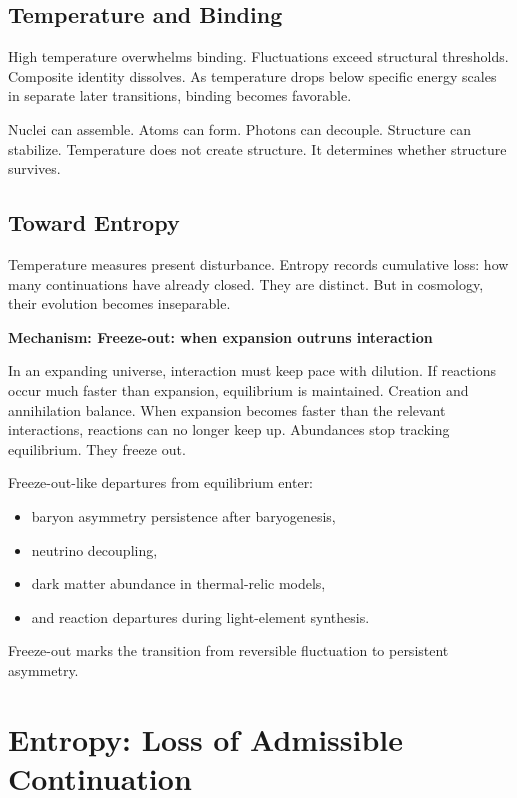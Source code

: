 \documentclass[11pt,twoside,openright]{book}
\newenvironment{mechanismbox}[1]
  {\begin{framed}\noindent\textbf{Mechanism: #1}\par\medskip}
  {\end{framed}}
\begin{document}
\section*{Temperature and Binding}

High temperature overwhelms binding. Fluctuations exceed structural thresholds. Composite identity dissolves. As temperature drops below specific energy scales in separate later transitions, binding becomes favorable.

Nuclei can assemble. Atoms can form. Photons can decouple. Structure can stabilize. Temperature does not create structure. It determines whether structure survives.

\section*{Toward Entropy}

Temperature measures present disturbance. Entropy records cumulative loss: how many continuations have already closed. They are distinct. But in cosmology, their evolution becomes inseparable.

\begin{mechanismbox}{Freeze-out: when expansion outruns interaction}

In an expanding universe, interaction must keep pace with dilution. If reactions occur much faster than expansion, equilibrium is maintained. Creation and annihilation balance. When expansion becomes faster than the relevant interactions, reactions can no longer keep up. Abundances stop tracking equilibrium. They freeze out.

Freeze-out-like departures from equilibrium enter:

\begin{itemize}
\item baryon asymmetry persistence after baryogenesis,
\item neutrino decoupling,
\item dark matter abundance in thermal-relic models,
\item and reaction departures during light-element synthesis.
\end{itemize}

Freeze-out marks the transition from reversible fluctuation to persistent asymmetry.

\end{mechanismbox}

\chapter{Entropy: Loss of Admissible Continuation}
\end{document}

